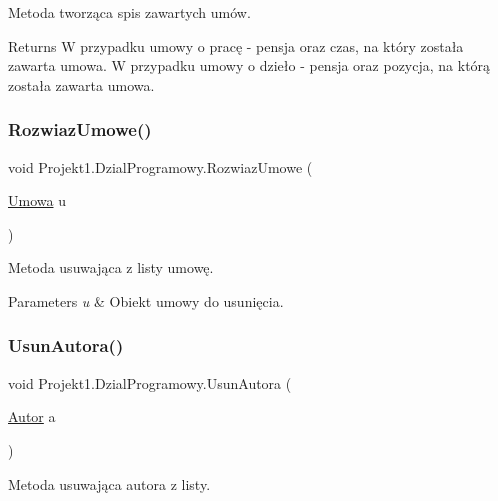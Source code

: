 Metoda tworząca spis zawartych umów. 

\begin{DoxyReturn}{Returns}
W przypadku umowy o pracę -\/ pensja oraz czas, na który została zawarta umowa. W przypadku umowy o dzieło -\/ pensja oraz pozycja, na którą została zawarta umowa. 
\end{DoxyReturn}
\mbox{\label{class_projekt1_1_1_dzial_programowy_a3852b732a1b07ffc107ac6dc90fb5d64}} 
\subsubsection{\texorpdfstring{RozwiazUmowe()}{RozwiazUmowe()}}
{\footnotesize\ttfamily void Projekt1.\+Dzial\+Programowy.\+Rozwiaz\+Umowe (\begin{DoxyParamCaption}\item[{\mbox{\hyperlink{class_projekt1_1_1_umowa}{Umowa}}}]{u }\end{DoxyParamCaption})}



Metoda usuwająca z listy umowę. 


\begin{DoxyParams}{Parameters}
{\em u} & Obiekt umowy do usunięcia.\\
\hline
\end{DoxyParams}
\mbox{\label{class_projekt1_1_1_dzial_programowy_abb3d14c312ae10ce95b8b7800b6a7a78}} 
\subsubsection{\texorpdfstring{UsunAutora()}{UsunAutora()}}
{\footnotesize\ttfamily void Projekt1.\+Dzial\+Programowy.\+Usun\+Autora (\begin{DoxyParamCaption}\item[{\mbox{\hyperlink{class_projekt1_1_1_autor}{Autor}}}]{a }\end{DoxyParamCaption})}



Metoda usuwająca autora z listy. 


